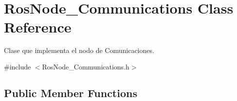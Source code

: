 \hypertarget{class_ros_node___communications}{\section{\-Ros\-Node\-\_\-\-Communications \-Class \-Reference}
\label{class_ros_node___communications}
}


\-Clase que implementa el nodo de \-Comunicaciones.  




{\ttfamily \#include $<$\-Ros\-Node\-\_\-\-Communications.\-h$>$}

\subsection*{\-Public \-Member \-Functions}
